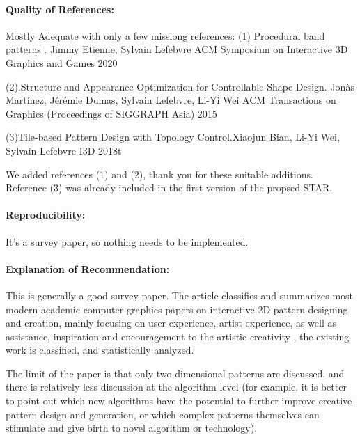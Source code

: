 \documentclass{egpubl}
\newcommand{\rev}[2]{{\color{greenrev}\textsuperscript{#1}#2}}
\renewcommand{\rev}[2]{{#2}}
\begin{document}
\paragraph*{Quality of References:} Mostly Adequate with only a few missiong references:
(1)
Procedural band patterns . Jimmy Etienne, Sylvain Lefebvre
ACM Symposium on Interactive 3D Graphics and Games 2020

(2).Structure and Appearance Optimization for Controllable Shape Design.
Jonàs Martínez, Jérémie Dumas, Sylvain Lefebvre, Li-Yi Wei
ACM Transactions on Graphics (Proceedings of SIGGRAPH Asia) 2015

(3)Tile-based Pattern Design with Topology Control.Xiaojun Bian, Li-Yi Wei, Sylvain Lefebvre
I3D 2018t

\rev{Comment}{
    We added references (1) and (2), thank you for these suitable additions. Reference (3) was already included in the first version of the propsed STAR.
}

\paragraph*{Reproducibility:} It's a survey paper, so nothing needs to be implemented.
\paragraph*{Explanation of Recommendation:} This is generally a good survey paper. The article classifies and summarizes most modern academic computer graphics papers on interactive 2D pattern designing and creation, mainly focusing on user experience, artist experience, as well as assistance, inspiration and encouragement  to the artistic creativity , the existing work is classified, and statistically analyzed.

The limit of the paper is that only two-dimensional patterns are discussed, and there is relatively less discussion at the algorithm level (for example, it is better to point out which new algorithms have the potential to further improve creative pattern design and generation, or which complex patterns themselves can stimulate and give birth to novel  algorithm or  technology).





%  
%        




\printbibliography
\end{document}
